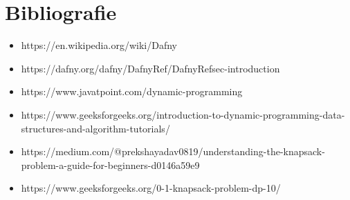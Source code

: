 \chapter*{Bibliografie} 

\begin{itemize}
    \item https://en.wikipedia.org/wiki/Dafny
    \item https://dafny.org/dafny/DafnyRef/DafnyRef{\texthash}sec-introduction
    \item https://www.javatpoint.com/dynamic-programming
    \item https://www.geeksforgeeks.org/introduction-to-dynamic-programming-data-structures-and-algorithm-tutorials/
    \item https://medium.com/@prekshayadav0819/understanding-the-knapsack-problem-a-guide-for-beginners-d0146a59e9
    \item https://www.geeksforgeeks.org/0-1-knapsack-problem-dp-10/
\end{itemize}